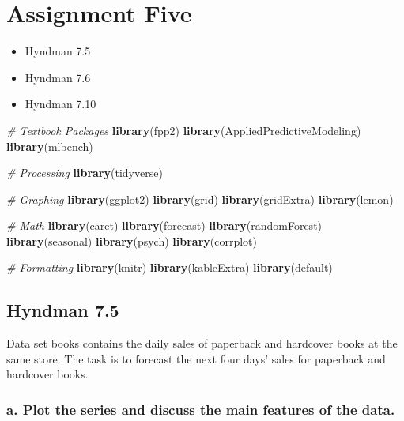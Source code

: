 \documentclass[openany]{book}
\newenvironment{Shaded}{\begin{snugshade}}{\end{snugshade}}
\newcommand{\CommentTok}[1]{\textcolor[rgb]{0.56,0.35,0.01}{\textit{#1}}}
\newcommand{\KeywordTok}[1]{\textcolor[rgb]{0.13,0.29,0.53}{\textbf{#1}}}
\newcommand{\NormalTok}[1]{#1}
\providecommand{\tightlist}{%
  \setlength{\itemsep}{0pt}\setlength{\parskip}{0pt}}
\renewenvironment{quote}{\begin{myquote}}{\end{myquote}}
\begin{document}
\hypertarget{assignment-five}{%
\chapter{Assignment Five}\label{assignment-five}}

\begin{itemize}
\tightlist
\item
  Hyndman 7.5
\item
  Hyndman 7.6
\item
  Hyndman 7.10
\end{itemize}

\begin{Shaded}
\begin{Highlighting}[]
\CommentTok{# Textbook Packages}
\KeywordTok{library}\NormalTok{(fpp2)}
\KeywordTok{library}\NormalTok{(AppliedPredictiveModeling)}
\KeywordTok{library}\NormalTok{(mlbench)}

\CommentTok{# Processing}
\KeywordTok{library}\NormalTok{(tidyverse)}

\CommentTok{# Graphing}
\KeywordTok{library}\NormalTok{(ggplot2)}
\KeywordTok{library}\NormalTok{(grid)}
\KeywordTok{library}\NormalTok{(gridExtra)}
\KeywordTok{library}\NormalTok{(lemon)}

\CommentTok{# Math}
\KeywordTok{library}\NormalTok{(caret)}
\KeywordTok{library}\NormalTok{(forecast)}
\KeywordTok{library}\NormalTok{(randomForest)}
\KeywordTok{library}\NormalTok{(seasonal)}
\KeywordTok{library}\NormalTok{(psych)}
\KeywordTok{library}\NormalTok{(corrplot)}

\CommentTok{# Formatting}
\KeywordTok{library}\NormalTok{(knitr)}
\KeywordTok{library}\NormalTok{(kableExtra)}
\KeywordTok{library}\NormalTok{(default)}
\end{Highlighting}
\end{Shaded}

\hypertarget{hyndman-7.5}{%
\section{Hyndman 7.5}\label{hyndman-7.5}}

\begin{quote}
Data set books contains the daily sales of paperback and hardcover books at the same store. The task is to forecast the next four days' sales for paperback and hardcover books.
\end{quote}

\hypertarget{a.-plot-the-series-and-discuss-the-main-features-of-the-data.}{%
\subsection{a. Plot the series and discuss the main features of the data.}\label{a.-plot-the-series-and-discuss-the-main-features-of-the-data.}}
\end{document}
